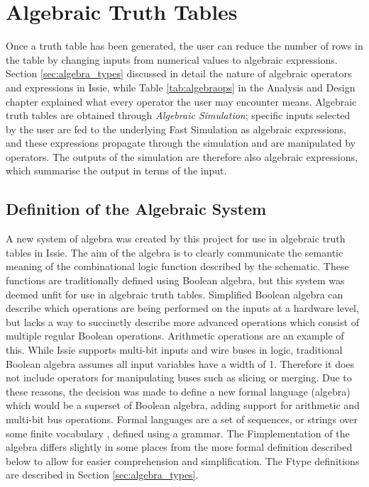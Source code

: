 \section{Algebraic Truth Tables}
Once a truth table has been generated, the user can reduce the number of rows in the table by changing inputs from numerical values to algebraic expressions. Section \ref{sec:algebra_types} discussed in detail the nature of algebraic operators and expressions in Issie, while Table \ref{tab:algebraops} in the Analysis and Design chapter explained what every operator the user may encounter means. Algebraic truth tables are obtained through \textit{Algebraic Simulation}; specific inputs selected by the user are fed to the underlying Fast Simulation as  algebraic expressions, and these expressions propagate through the simulation and are manipulated by operators. The outputs of the simulation are therefore also algebraic expressions, which summarise the output in terms of the input. 

\subsection{Definition of the Algebraic System}
A new system of algebra was created by this project for use in algebraic truth tables in Issie. The aim of the algebra is to clearly communicate the semantic meaning of the combinational logic function described by the schematic. These functions are traditionally defined using Boolean algebra, but this system was deemed unfit for use in algebraic truth tables. Simplified Boolean algebra can describe which operations are being performed on the inputs at a hardware level, but lacks a way to succinctly describe more advanced operations which consist of multiple regular Boolean operations. Arithmetic operations are an example of this. While Issie supports multi-bit inputs and wire buses in logic, traditional Boolean algebra assumes all input variables have a width of 1. Therefore it does not include operators for manipulating buses such as slicing or merging. Due to these reasons, the decision was made to define a new formal language (algebra) which would be a superset of Boolean algebra, adding support for arithmetic and multi-bit bus operations. Formal languages are a set of sequences, or strings over some finite vocabulary \cite{jäger_rogers_2012}, defined using a grammar. The F\fsharp implementation of the algebra differs slightly in some places from the more formal definition described below to allow for easier comprehension and simplification. The F\fsharp type definitions are described in Section \ref{sec:algebra_types}.

